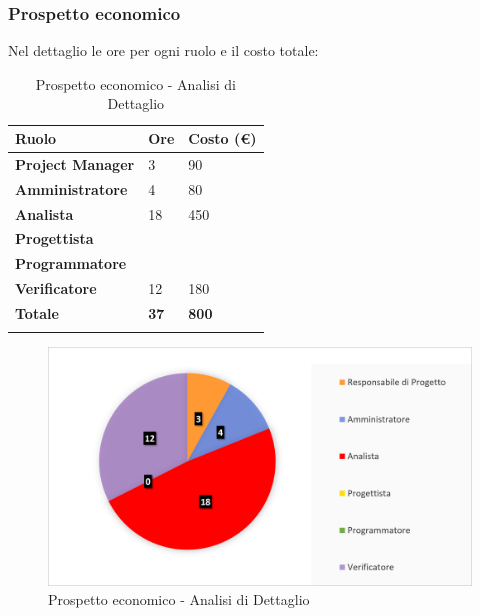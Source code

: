 \subsubsection{Prospetto economico}
Nel dettaglio le ore per ogni ruolo e il costo totale: 
\begin{center}
	\def\arraystretch{1.6}
	\bgroup
	\begin{longtable}{| p{4cm} | p{1cm} | p{2cm} |}
		\hline
		\textbf{Ruolo} & \textbf{Ore} & \textbf{Costo (€)} \\ 
		
		\hline \hline  
		
		\textbf{Project Manager} & {3} & {90} \\ 
		\hline 
		
		\textbf{Amministratore} & {4} & {80} \\ 
		\hline 
		
		\textbf{Analista} & {18} & {450} \\ 
		\hline 
		
		\textbf{Progettista} & {} & {} \\ 
		\hline 
		
		\textbf{Programmatore} & {} & {} \\ 
		\hline 
		
		\textbf{Verificatore} & {12} & {180} \\ 
		\hline 
		
		\textbf{Totale} & \textbf{37} & \textbf{800} \\ 
		\hline 
		
		
		\hline 
		
		\caption{Prospetto economico - Analisi di Dettaglio}
	\end{longtable}
	\egroup
\end{center}
\begin{figure}[H]
	\centering
	\includegraphics[width= 14cm]{immagini/ad_torta.png}
	\caption{Prospetto economico - Analisi di Dettaglio}
\end{figure}
\newpage

